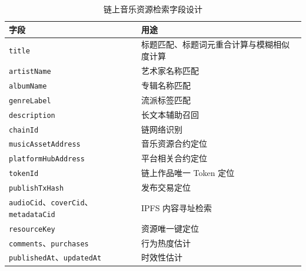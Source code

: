 \begin{table}[htbp]
    \linespread{1.5}
    \songti
    \centering
    \caption{链上音乐资源检索字段设计}\label{tab:ranking_fields_rewrite}
    \begin{tabular}{|p{3.35cm}|p{8.6cm}|}
        \hline
        字段                                                       & 用途                    \\ \hline
        \texttt{title}                                           & 标题匹配、标题词元重合计算与模糊相似度计算 \\ \hline
        \texttt{artistName}                                      & 艺术家名称匹配               \\ \hline
        \texttt{albumName}                                       & 专辑名称匹配                \\ \hline
        \texttt{genreLabel}                                      & 流派标签匹配                \\ \hline
        \texttt{description}                                     & 长文本辅助召回               \\ \hline
        \texttt{chainId}                                         & 链网络识别                 \\ \hline
        \texttt{musicAssetAddress}                               & 音乐资源合约定位              \\ \hline
        \texttt{platformHubAddress}                              & 平台相关合约定位              \\ \hline
        \texttt{tokenId}                                         & 链上作品唯一 Token 定位       \\ \hline
        \texttt{publishTxHash}                                   & 发布交易定位                \\ \hline
        \texttt{audioCid}、\texttt{coverCid}、\texttt{metadataCid} & IPFS 内容寻址检索           \\ \hline
        \texttt{resourceKey}                                     & 资源唯一键定位               \\ \hline
        \texttt{comments}、\texttt{purchases}                     & 行为热度估计                \\ \hline
        \texttt{publishedAt}、\texttt{updatedAt}                  & 时效性估计                 \\ \hline
    \end{tabular}
\end{table}


